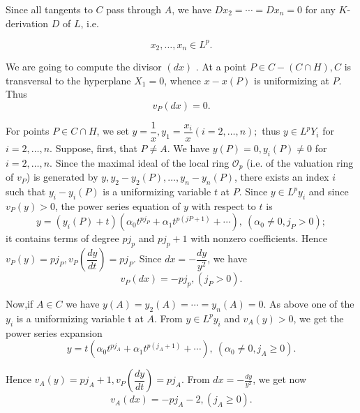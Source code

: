 Since all tangents to $C$ pass through $A$, we have $Dx_2  =  \cdots =
Dx_n=0$ for any $K$-derivation $D$ of $L$, i.e. 
 
\begin{equation*}
  x_2,\ldots ,x_n \in   L^p.\tag{1}\label{chap2:sec4:appen-eq1}
\end{equation*}

We are going to compute the divisor $(dx)$ . At a point $P \in
C-(C\cap H), C$ is transversal to the hyperplane $X_1=0$, whence
$x-x(P)$ is uniformizing at $P$. Thus 
\begin{equation*}
  v_P (dx)=0. \tag{2}\label{chap2:sec4:appen-eq2}
\end{equation*}

For points $P \in   C \cap H$, we set $y=
\dfrac{1}{x},y_1=\dfrac{x_i}{x}(i=2,\ldots ,n);$ thus $y \in   L^p Y_i$
for $i=2,\ldots ,n$. Suppose, first, that $P \neq A$. We have $y(P) =
0, y_i(P) \neq 0$ for $i = 2, \ldots, n$. Since the maximal ideal  of
the local ring ${\mathscr{O}}_p$ (i.e. of the valuation ring of $v_P$)
is generated by $y, y_2-y_2(P),\ldots , y_n-y_n(P)$, there exists an
index $i$ such that $y_i-y_i(P)$ is a uniformizing variable $t$ at
$P$. Since $y \in   L^p y_i$ and since $v_P (y)>0$, the power series
equation of $y$ with respect to $t$ is  
$$
y=(y_i(P)+t)(\alpha _0 t^{pj_P}+\alpha _1t^{p(jP+1)}+
\cdots), ~(\alpha _0\neq 0, j_P>0); 
$$
it contains terms of degree $pj_p$ and $pj_p + 1$  with nonzero
coefficients. Hence $v_P(y)=pj_P, v_P
\left(\dfrac{dy}{dt}\right)=pj_P$. Since 
$dx=-\dfrac{dy}{y^2}$, we have  
\begin{equation*}
  v_P(dx)=-pj_p,(j_P > 0).\tag{3}\label{chap2:sec4:appen-eq3}
\end{equation*}

Now,\pageoriginale if $A \in   C$ we have $y(A)=y_2(A)=\cdots =y_n(A)=0$. As above
one of the $y_i$ is a uniformizing variable t at $A$. From $y \in
L^py_i$ and $v_A(y)>0$, we get the power series expansion  
$$
y=t(\alpha _0 t^{pj_A}+\alpha _1 t^{p(j_A+1)}+\cdots), ~(\alpha_0\neq
0, j_A\ge 0). 
$$

Hence $v_A(y)=pj_A+1,v_P\left(\dfrac{dy}{dt}\right)=pj_A$. From $dx
=-\frac{dy}{y^2}$, we get now  
\begin{equation*}
  v_A(dx)=-pj_A-2, (j_A\ge 0).\tag{4}\label{chap2:sec4:appen-eq4}
\end{equation*}

